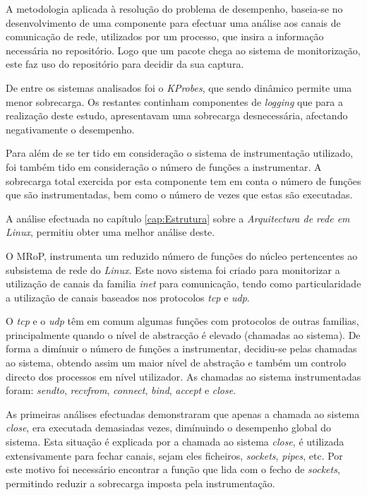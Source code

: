 
A metodologia aplicada à resolução do problema de desempenho, baseia-se no desenvolvimento de uma componente para efectuar uma análise aos canais de comunicação de rede, utilizados por um processo, que insira a informação necessária no repositório.
Logo que um pacote chega ao sistema de monitorização, este faz uso do repositório para decidir da sua captura.


De entre os sistemas analisados foi o \textit{KProbes}, que sendo dinâmico permite uma menor sobrecarga.
Os restantes continham componentes de \textit{logging} que para a realização deste estudo, apresentavam uma sobrecarga desnecessária, afectando negativamente o desempenho.

Para além de se ter tido em consideração o sistema de instrumentação utilizado, foi também tido em consideração o número de funções a instrumentar.
A sobrecarga total exercida por esta componente tem em conta o número de funções que são instrumentadas, bem como o número de vezes que estas são executadas.

A análise efectuada no capítulo \ref{cap:Estrutura} sobre a \textit{Arquitectura de rede em Linux}, permitiu obter uma melhor análise deste.

O MRoP, instrumenta um reduzido número de funções do núcleo pertencentes ao subsistema de rede do \textit{Linux}.
Este novo sistema foi criado para monitorizar a utilização de canais da familia \textit{inet} para comunicação, tendo como particularidade a utilização de canais baseados nos protocolos \textit{tcp} e \textit{udp}.

O \textit{tcp} e o \textit{udp} têm em comum algumas funções com protocolos de outras familias, principalmente quando o nível de abstracção é elevado (chamadas ao sistema).
De forma a dimínuir o número de funções a instrumentar, decidiu-se pelas chamadas ao sistema, obtendo assim um maior nível de abstração e também um controlo directo dos processos em nível utilizador.
As chamadas ao sistema instrumentadas foram: \textit{sendto}, \textit{recvfrom}, \textit{connect}, \textit{bind}, \textit{accept} e \textit{close}.

As primeiras análises efectuadas demonstraram que apenas a chamada ao sistema \textit{close}, era executada demasiadas vezes, dimínuindo o desempenho global do sistema.
Esta situação é explicada por a chamada ao sistema \textit{close}, é utilizada extensivamente para fechar canais, sejam eles ficheiros, \textit{sockets}, \textit{pipes}, etc.
Por este motivo foi necessário encontrar a função que lida com o fecho de \textit{sockets}, permitindo reduzir a sobrecarga imposta pela instrumentação.


